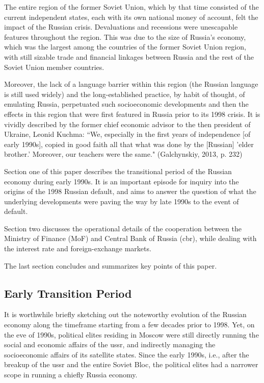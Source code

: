 The entire region of the former Soviet Union, which by that time consisted of the current independent states, each with its own national money of account, felt the impact of the Russian crisis. Devaluations and recessions were unescapable features throughout the region. This was due to the size of Russia's economy, which was the largest among the countries of the former Soviet Union region, with still sizable trade and financial linkages between Russia and the rest of the Soviet Union member countries. 

Moreover, the lack of a language barrier within this region (the Russian language is still used widely) and the long-established practice, by habit of thought, of emulating Russia, perpetuated such socioeconomic developments and then the effects in this region that were first featured in Russia prior to its 1998 crisis. It is vividly described by the former chief economic advisor to the then president of Ukraine, Leonid Kuchma: ``We, especially in the first years of independence [of early 1990s], copied in good faith all that what was done by the [Russian] 'elder brother.' Moreover, our teachers were the same." (Galchynskiy, 2013, p. 232)

Section one of this paper describes the transitional period of the Russian economy during early 1990s. It is an important episode for inquiry into the origins of the 1998 Russian default, and aims to answer the question of what the underlying developments were paving the way by late 1990s to the event of default.

Section two discusses the operational details of the cooperation between the Ministry of Finance (MoF) and Central Bank of Russia (\ac{cbr}), while dealing with the interest rate and foreign-exchange markets.

The last section concludes and summarizes key points of this paper.

\subsection{Early Transition Period}

It is worthwhile briefly sketching out the noteworthy evolution of the Russian economy along the timeframe starting from a few decades prior to 1998. Yet, on the eve of 1990s, political elites residing in Moscow were still directly running the social and economic affairs of the \ac{ussr}, and indirectly managing the socioeconomic affairs of its satellite states. Since the early 1990s, i.e., after the breakup of the \ac{ussr} and the entire Soviet Bloc, the political elites had a narrower scope in running a chiefly Russia economy. 

